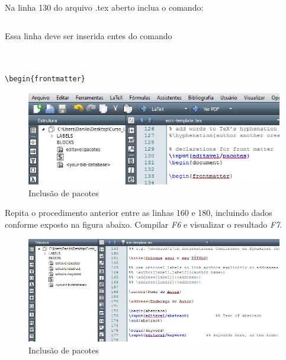 \begin{frame}[fragile]
Na linha 130 do arquivo .tex aberto inclua o comando:
\begin{verbatim}

\end{verbatim}

Essa linha deve ser inserida entes do comando

\begin{verbatim}


\begin{frontmatter}
\end{verbatim}

\begin{figure}
\begin{center}
\includegraphics[scale=0.5]{figuras/fig2}
\caption{Inclusão de pacotes}
\end{center}
\end{figure}
\end{frame}



\begin{frame}[fragile]
Repita o procedimento anterior entre as linhas 160 e 180, incluindo dados conforme exposto na figura abaixo.
Compilar \textit{F6}  e visualizar o resultado \textit{F7}.
\begin{figure}
\begin{center}
\includegraphics[scale=.5]{figuras/fig3}
\caption{Inclusão de pacotes}
\end{center}
\end{figure}
\end{frame}


